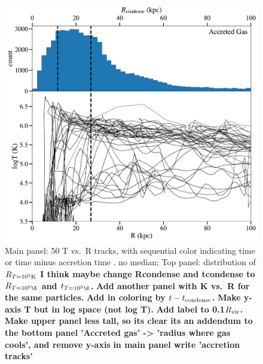 \documentclass[fleqn,usenatbib]{mnras}
\newcommand{\Rcool}{R_{T=10^5 {\rm K}}}
\begin{document}
\begin{figure}
    \centering
    \includegraphics[width=\columnwidth]{figures/rcondense_and_tracks.pdf}
    \caption{
    Main panel: 50 T vs.\ R tracks, with sequential color indicating time or time minus accretion time . no median;
    Top panel: distribution of $\Rcool$
    \textbf{I think maybe change Rcondense and tcondense to $R_{T=10^5\K}$ and $t_{T=10^5\K}$.}
    \textbf{Add another panel with K vs.~R for the same particles.}
    \textbf{Add in coloring by $t - t_{\rm{condense}}$.}
    \textbf{Make y-axis T but in log space (not log T).}
    \textbf{Add label to 0.1$R_{\rm vir}$.}
    \textbf{Make upper panel less tall, so its clear its an addendum to the bottom panel}
    \textbf{'Accreted gas' -> 'radius where gas cools', and remove y-axis}
    \textbf{in main panel write 'accretion tracks'}
    }
    \label{f: T vs R}
\end{figure}
\end{document}
